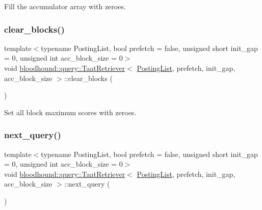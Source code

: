 Fill the accumulator array with zeroes. 

\mbox{\label{classbloodhound_1_1query_1_1TaatRetriever_a00a64711e5d865ba4c53e3accdb61d3f}} 
\subsubsection{\texorpdfstring{clear\+\_\+blocks()}{clear\_blocks()}}
{\footnotesize\ttfamily template$<$typename Posting\+List, bool prefetch = false, unsigned short init\+\_\+gap = 0, unsigned int acc\+\_\+block\+\_\+size = 0$>$ \\
void \hyperlink{classbloodhound_1_1query_1_1TaatRetriever}{bloodhound\+::query\+::\+Taat\+Retriever}$<$ \hyperlink{classbloodhound_1_1PostingList}{Posting\+List}, prefetch, init\+\_\+gap, acc\+\_\+block\+\_\+size $>$\+::clear\+\_\+blocks (\begin{DoxyParamCaption}{ }\end{DoxyParamCaption})\hspace{0.3cm}{\ttfamily [inline]}}



Set all block maximum scores with zeroes. 

\mbox{\label{classbloodhound_1_1query_1_1TaatRetriever_ad6739ab7025c6de9e65945cff25c55b4}} 
\subsubsection{\texorpdfstring{next\+\_\+query()}{next\_query()}}
{\footnotesize\ttfamily template$<$typename Posting\+List, bool prefetch = false, unsigned short init\+\_\+gap = 0, unsigned int acc\+\_\+block\+\_\+size = 0$>$ \\
void \hyperlink{classbloodhound_1_1query_1_1TaatRetriever}{bloodhound\+::query\+::\+Taat\+Retriever}$<$ \hyperlink{classbloodhound_1_1PostingList}{Posting\+List}, prefetch, init\+\_\+gap, acc\+\_\+block\+\_\+size $>$\+::next\+\_\+query (\begin{DoxyParamCaption}{ }\end{DoxyParamCaption})\hspace{0.3cm}{\ttfamily [inline]}}

